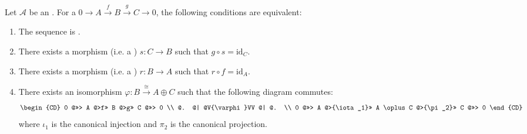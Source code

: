 \begin{theorem} \label{theorem:equivalent_conditions_for_a_short_exact_sequence_in_an_additive_category_to_be_split}
Let $\mathcal{A}$ be an . For a  $0 \to A \xrightarrow{f} B \xrightarrow{g} C \to 0$, the following conditions are equivalent:
\begin{enumerate}
    \item The sequence is .
    \item There exists a morphism (i.e. a ) $s: C \to B$ such that $g \circ s = \text{id}_C$.
    \item There exists a morphism (i.e. a ) $r: B \to A$ such that $r \circ f = \text{id}_A$.
    \item There exists an isomorphism $\varphi: B \xrightarrow{\cong} A \oplus C$ such that the following diagram commutes:
    $$
    \begin{CD}
    0 @>>> A @>f>> B @>g>> C @>>> 0 \\
    @. @| @V{\varphi}VV @| @. \\
    0 @>>> A @>{\iota_1}>> A \oplus C @>{\pi_2}>> C @>>> 0
    \end{CD}
    $$
    where $\iota_1$ is the canonical injection and $\pi_2$ is the canonical projection.
\end{enumerate}
\end{theorem}